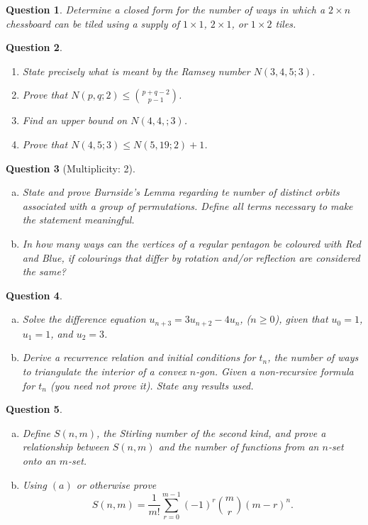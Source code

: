 \documentclass[12]{article}
\newtheorem{question}{Question}
\theoremstyle{definition}
\begin{document}
	\begin{question}
		Determine a closed form for the number of ways in which a $2 \times n$ chessboard can be tiled using a supply of $1 \times 1$, $2 \times 1$, or $1 \times 2$ tiles.
	\end{question}

	\begin{question}
		\
		\begin{enumerate}
			\item State precisely what is meant by the Ramsey number $N(3,4,5;3)$.
			\item Prove that $N(p,q;2) \leq {p + q - 2 \choose p-1}$.
			\item Find an upper bound on $N(4,4,;3)$.
			\item Prove that $N(4,5;3) \leq N(5,19;2)+1$.
		\end{enumerate}
	\end{question}

	\begin{question}[Multiplicity: 2]
		\
		\begin{enumerate}[a)]
			\item State and prove Burnside's Lemma regarding te number of distinct orbits associated with a group of permutations.  Define all terms necessary to make the statement meaningful.
			\item In how many ways can the vertices of a regular pentagon be coloured with Red and Blue, if colourings that differ by rotation and/or reflection are considered the same?
		\end{enumerate}
	\end{question}

	\begin{question}
		\
		\begin{enumerate}[a)]
			\item Solve the difference equation $u_{n+3} = 3u_{n+2}-4u_n$, ($n \geq 0$), given that $u_0 = 1$, $u_1 = 1$, and $u_2 = 3$.
			\item Derive a recurrence relation and initial conditions for $t_n$, the number of ways to triangulate the interior of a convex $n$-gon.  Given a non-recursive formula for $t_n$ (you need not prove it).  State any results used.
		\end{enumerate}
	\end{question}

	\begin{question}
		\
		\begin{enumerate}[a)]
			\item Define $S(n,m)$, the Stirling number of the second kind, and prove a relationship between $S(n,m)$ and the number of functions from an $n$-set onto an $m$-set.
			\item Using $(a)$ or otherwise prove
			$$S(n,m) = \frac{1}{m!} \sum_{r=0}^{m-1}(-1)^r {m \choose r}(m-r)^n.$$
		\end{enumerate}
	\end{question}
	
\end{document}
